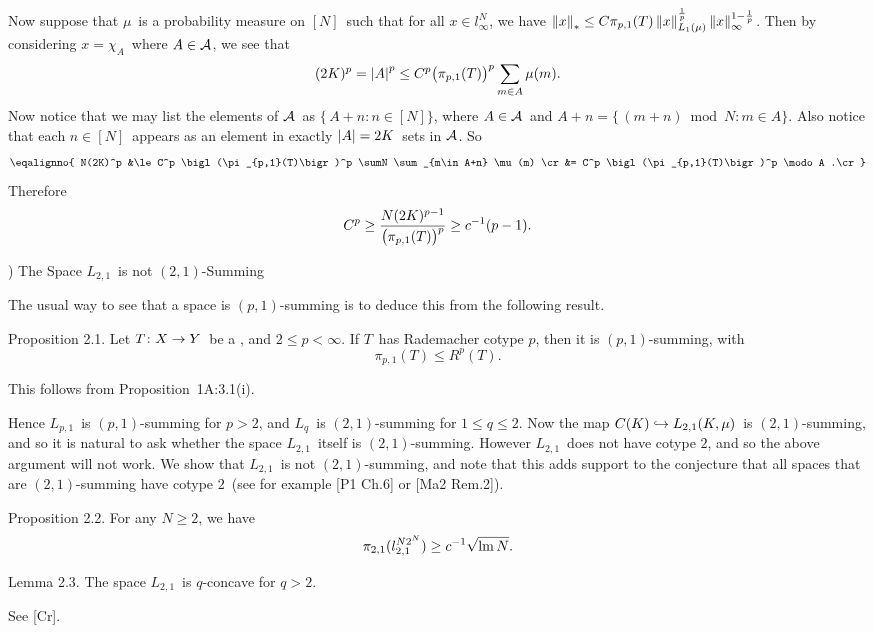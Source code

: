 Now suppose that $\mu$\ is a probability measure on $[N]$\ such that
for all
$x\in l_\infty^N$, we have
$\left\| x \right\|_* \le C \pi_{p,1}(T) \left\| x \right\|_{L_1(\mu)}^{1\over p}
\left\| x \right\|_\infty^{1-{1\over p}}$. Then by considering $x=\chi_A$\ where
$A\in{\cal A}$, we
see that
$$ (2K)^p = \left| A\right|^p \le C^p \bigl(\pi_{p,1}(T)\bigr)^p \sum_{m\in
A} \mu(m) .$$
Now notice that we may list the elements of ${\cal A}$\ as $\{\,A+n:n\in[N]\}$,
where
$A\in{\cal A}$\ and $A+n=\{\,(m+n)\bmod N : m\in A\}$. Also notice that
each
$n\in[N]$\ appears as an element in exactly $\left| A\right|=2K$\ sets in
${\cal A}$. So
$$ \eqalignno{
   N(2K)^p
   &\le C^p \bigl(\pi_{p,1}(T)\bigr)^p \sumN \sum_{m\in A+n} \mu(m)
\cr
   &=   C^p \bigl(\pi_{p,1}(T)\bigr)^p \modo A .\cr}$$
Therefore
$$ C^p \ge {N(2K)^{p-1}\over\bigl(\pi_{p,1}(T)\bigr)^p} \ge c^{-1}
(p-1) .$$
\endproof
 
\vfill
\eject
 
) The Space $L_{2,1}$\ is not $(2,1)$-Summing
 
The usual way to see that a space
is $(p,1)$-summing is to deduce this from the following result.
 
\proclaim Proposition 2.1. Let $T\colon X\to Y$\ be a \blobBs, and $2\le p<\infty$.
If\/ $T$\ has Rademacher cotype $p$, then it is $(p,1)$-summing,
with
$$ \pi_{p,1}(T) \le R^p(T) .$$
 
\Proof This follows from Proposition~1A:3.1(i).
\endproof
 
Hence $L_{p,1}$\ is $(p,1)$-summing for $p>2$, and $L_q$\ is $(2,1)$-summing
for $1\le q\le2$.
Now the map $C(K)\hookrightarrow L_{2,1}(K,\mu)$\ is $(2,1)$-summing, and so it is natural
to ask
whether the
space $L_{2,1}$\ itself is $(2,1)$-summing. However $L_{2,1}$\ does
not have
cotype $2$, and so the above
argument will not work. We show that $L_{2,1}$\ is not $(2,1)$-summing,
and
note that this adds support to the conjecture that all spaces that
are $(2,1)$-summing have cotype $2$\ (see
for example [P1 Ch.6] or [Ma2 Rem.2]).
 
\proclaim Proposition 2.2. For any $N\ge2$, we have
$$ \pi_{2,1} (l_{2,1}^{N2^N} ) \ge c^{-1} \sqrt{\mathop{\rm lm}\nolimits N} .$$
 
\proclaim Lemma 2.3. The space $L_{2,1}$\ is $q$-concave for $q>2$.
 
\Proof See [Cr].
\endproof
 
